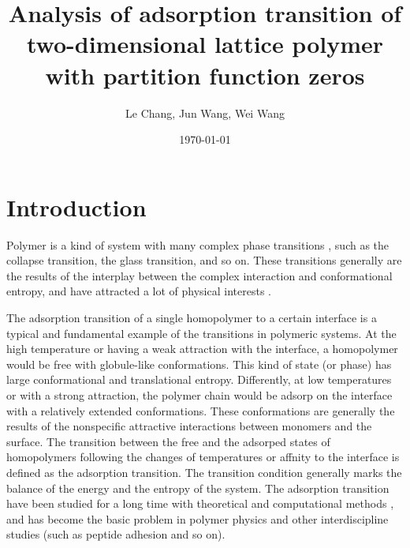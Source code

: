 \documentclass[preprint,preprintnumbers,amsmath,amssymb,showpacs,aps,pre]{revtex4-1}
\begin{document}
\title{Analysis of adsorption transition of two-dimensional lattice
polymer with partition function zeros}
\author{Le Chang, Jun Wang, Wei Wang}


\date{\today}

\begin{abstract}

\end{abstract}


\maketitle

\section{Introduction}

Polymer is a kind of system with many complex phase transitions
\cite{LifshitzRMP78}, such as the collapse transition\cite{FloryJCP49,
FloryBOOK67,WilliamsARPC81}, the glass transition\cite{GibbsJCP58,
JackleRPP86}, and so on. These transitions generally are the results
of the interplay between the complex interaction and conformational
entropy, and have attracted a lot of physical interests
\cite{LifshitzRMP78,FloryJCP49,FloryBOOK67,WilliamsARPC81,GibbsJCP58,
JackleRPP86,deGennesBook79,StephenPLA75,RigByJCP1987,BellRMP93,
ChengARMR,PrivmanBook81,ZivPCCP09,ChengBook08,xx,xx,physrep}.

The adsorption transition of a single homopolymer to a certain interface
is a typical and fundamental example of the transitions in polymeric
systems\cite{LifshitzRMP78,
FloryBOOK67,deGennesBook79,ZivPCCP09,ChengBook08,physrep}.
At the high temperature or having a weak attraction with the interface,
a homopolymer would be free with globule-like conformations. This kind
of state (or phase) has large conformational and translational entropy.
Differently, at low temperatures or with a strong attraction, the polymer
chain would be adsorp on the interface with a relatively extended
conformations. These conformations are generally the results of the
nonspecific attractive interactions between monomers and the surface.
The transition between the free and the adsorped states of homopolymers
following the changes of temperatures or affnity to the interface is
defined as the adsorption transition. The transition condition generally
marks the balance of the energy and the entropy of the system.
The adsorption transition have been studied for a long time with theoretical
and computational methods
\cite{deGennesBook79,PrivmanBook81,ZivPCCP09,SaleurJSP86,
DuplantierPRL87,StanleyPRB89,BinderBook95,OYJCP08,CaparicaCPC09,
BinderBook10,physrep,xx}, and has become the basic problem in polymer
physics\cite{LifshitzRMP78,deGennesBook79,ZivPCCP09,ChengBook08}
and other interdiscipline studies (such as peptide adhesion and so on).
\end{document}
